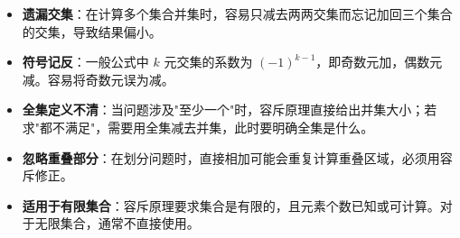 \begin{trapbox}
\begin{itemize}
    \item \textbf{遗漏交集}：在计算多个集合并集时，容易只减去两两交集而忘记加回三个集合的交集，导致结果偏小。
    \item \textbf{符号记反}：一般公式中 $k$ 元交集的系数为 $(-1)^{k-1}$，即奇数元加，偶数元减。容易将奇数元误为减。
    \item \textbf{全集定义不清}：当问题涉及"至少一个"时，容斥原理直接给出并集大小；若求"都不满足"，需要用全集减去并集，此时要明确全集是什么。
    \item \textbf{忽略重叠部分}：在划分问题时，直接相加可能会重复计算重叠区域，必须用容斥修正。
    \item \textbf{适用于有限集合}：容斥原理要求集合是有限的，且元素个数已知或可计算。对于无限集合，通常不直接使用。
\end{itemize}
\end{trapbox}